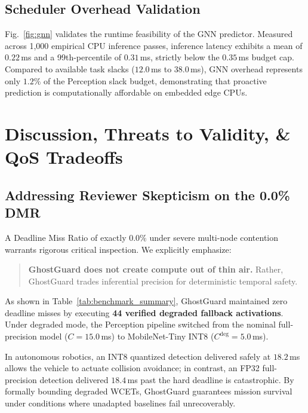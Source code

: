\documentclass[10pt,conference]{IEEEtran}
\begin{document}
\subsection{Scheduler Overhead Validation}
Fig.~\ref{fig:gnn} validates the runtime feasibility of the GNN predictor. Measured across 1,000 empirical CPU inference passes, inference latency exhibits a mean of $0.22$\,ms and a 99th-percentile of $0.31$\,ms, strictly below the $0.35$\,ms budget cap. Compared to available task slacks ($12.0$\,ms to $38.0$\,ms), GNN overhead represents only $1.2\%$ of the Perception slack budget, demonstrating that proactive prediction is computationally affordable on embedded edge CPUs.

\section{Discussion, Threats to Validity, \& QoS Tradeoffs}
\label{sec:discussion}

\subsection{Addressing Reviewer Skepticism on the 0.0\% DMR}
A Deadline Miss Ratio of exactly $0.0\%$ under severe multi-node contention warrants rigorous critical inspection. We explicitly emphasize:
\begin{quote}
\textbf{GhostGuard does not create compute out of thin air.} Rather, GhostGuard trades inferential precision for deterministic temporal safety.
\end{quote}
As shown in Table~\ref{tab:benchmark_summary}, GhostGuard maintained zero deadline misses by executing \textbf{44 verified degraded fallback activations}. Under degraded mode, the Perception pipeline switched from the nominal full-precision model ($C = 15.0$\,ms) to MobileNet-Tiny INT8 ($C^{\text{deg}} = 5.0$\,ms). 

In autonomous robotics, an INT8 quantized detection delivered safely at $18.2$\,ms allows the vehicle to actuate collision avoidance; in contrast, an FP32 full-precision detection delivered $18.4$\,ms past the hard deadline is catastrophic. By formally bounding degraded WCETs, GhostGuard guarantees mission survival under conditions where unadapted baselines fail unrecoverably.
\end{document}
